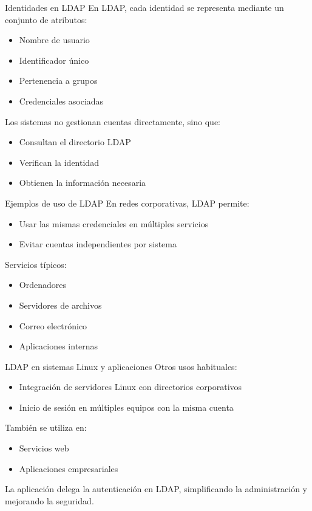 \documentclass{beamer}
\begin{document}
\begin{frame}{Identidades en LDAP}
En LDAP, cada identidad se representa mediante un conjunto de atributos:
\begin{itemize}
    \item Nombre de usuario
    \item Identificador único
    \item Pertenencia a grupos
    \item Credenciales asociadas
\end{itemize}

\vspace{0.3cm}
Los sistemas no gestionan cuentas directamente, sino que:
\begin{itemize}
    \item Consultan el directorio LDAP
    \item Verifican la identidad
    \item Obtienen la información necesaria
\end{itemize}
\end{frame}

\begin{frame}{Ejemplos de uso de LDAP}
En redes corporativas, LDAP permite:
\begin{itemize}
    \item Usar las mismas credenciales en múltiples servicios
    \item Evitar cuentas independientes por sistema
\end{itemize}

\vspace{0.3cm}
Servicios típicos:
\begin{itemize}
    \item Ordenadores
    \item Servidores de archivos
    \item Correo electrónico
    \item Aplicaciones internas
\end{itemize}
\end{frame}

\begin{frame}{LDAP en sistemas Linux y aplicaciones}
Otros usos habituales:
\begin{itemize}
    \item Integración de servidores Linux con directorios corporativos
    \item Inicio de sesión en múltiples equipos con la misma cuenta
\end{itemize}

\vspace{0.3cm}
También se utiliza en:
\begin{itemize}
    \item Servicios web
    \item Aplicaciones empresariales
\end{itemize}

\vspace{0.2cm}
La aplicación delega la autenticación en LDAP, simplificando la administración y mejorando la seguridad.
\end{frame}
\end{document}
